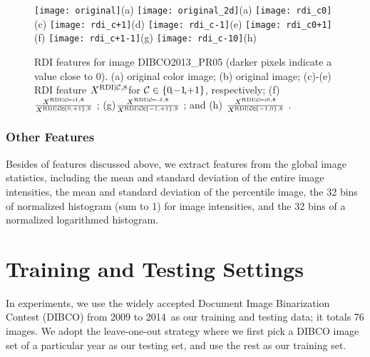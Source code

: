 \documentclass[onecolumn,11pt,draftcls,journal]{IEEEtran}
\def\fwII{.2}
\def\citeDIBCO{\cite{DIBCO2009,DIBCO2010,DIBCO2011,DIBCO2012,DIBCO2013,DIBCO2014}\,}
\begin{document}
\begin{figure}[!ht]
\centering\scriptsize
\texttt{[image: original]}{(a)}
\texttt{[image: original\_2d]}{(a)}
\texttt{[image: rdi\_c0]}{(c)}
\texttt{[image: rdi\_c+1]}{(d)}
\texttt{[image: rdi\_c-1]}{(e)}
\texttt{[image: rdi\_c0+1]}{(f)}
\texttt{[image: rdi\_c+1-1]}{(g)}
\texttt{[image: rdi\_c-10]}{(h)}
\caption{RDI features for image DIBCO2013\_PR05 (darker pixels indicate a value close to 0). (a) original color image; (b) original image; (c)-(e) RDI feature $X^{{\rm{RDI}}| {\cal{C}}, 8 }$for ${\cal{C}}\in\{0\!,\!-1\!,\!+1\}$, respectively; (f) ${ X^{{\rm{RDI}}| {\cal{C}}\!=\!+\!1, 8 }\over X^{{\rm{RDI}}| {\cal{C}}\!\in\!\{0,+1\}, 8 }}$ ; (g)${ X^{{\rm{RDI}}| {\cal{C}}\!=\!-\!1, 8 }\over X^{{\rm{RDI}}| {\cal{C}}\!\in\!\{-1,+1\}, 8 }}$ ; and (h) ${ X^{{\rm{RDI}}| {\cal{C}}\!=\!+\!0, 8 }\over X^{{\rm{RDI}}| {\cal{C}}\!\in\!\{-1,0\}, 8 }}$ .}
\label{fig.rdi}
\end{figure}
\subsubsection{Other Features}
Besides of features discussed above, we extract features from the global image statistics, including the mean and standard deviation of the entire image intensities, the mean and standard deviation of the percentile image, the 32 bins of normalized histogram (sum to 1) for image intensities, and the 32 bins of a normalized logarithmed histogram. 

\section{Training and Testing Settings}
\setcounter{subsubsection}{0}
In experiments, we use the widely accepted Document Image Binarization Contest (DIBCO) from 2009 to 2014 \citeDIBCO as our training and testing data; it totals 76 images. We adopt the leave-one-out strategy where we first pick a DIBCO image set of a particular year as our testing set, and use the rest as our training set.  
\end{document}

